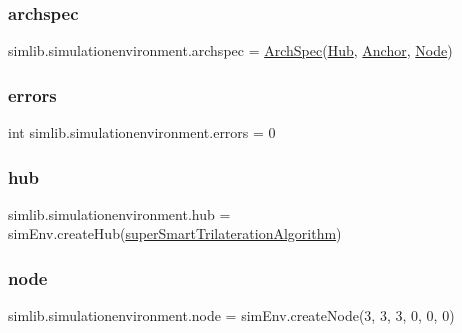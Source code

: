 \subsubsection{\texorpdfstring{archspec}{archspec}}
{\footnotesize\ttfamily simlib.\+simulationenvironment.\+archspec = \mbox{\hyperlink{classsimlib_1_1archspec_1_1_arch_spec}{Arch\+Spec}}(\mbox{\hyperlink{classsimlib_1_1hub_1_1_hub}{Hub}}, \mbox{\hyperlink{classsimlib_1_1anchor_1_1_anchor}{Anchor}}, \mbox{\hyperlink{classsimlib_1_1node_1_1_node}{Node}})}

\mbox{\label{namespacesimlib_1_1simulationenvironment_afca3d89fb0a9c3b8441731937fdb718b}} 
\subsubsection{\texorpdfstring{errors}{errors}}
{\footnotesize\ttfamily int simlib.\+simulationenvironment.\+errors = 0}

\mbox{\label{namespacesimlib_1_1simulationenvironment_af2a82533143b12ae401b918e0ae2df42}} 
\subsubsection{\texorpdfstring{hub}{hub}}
{\footnotesize\ttfamily simlib.\+simulationenvironment.\+hub = sim\+Env.\+create\+Hub(\mbox{\hyperlink{namespacesimlib_1_1simulationenvironment_a8566de74a9664d786456c8f421bae003}{super\+Smart\+Trilateration\+Algorithm}})}

\mbox{\label{namespacesimlib_1_1simulationenvironment_a49e74569249d8a4b630c5aeabe9219b3}} 
\subsubsection{\texorpdfstring{node}{node}}
{\footnotesize\ttfamily simlib.\+simulationenvironment.\+node = sim\+Env.\+create\+Node(3, 3, 3, 0, 0, 0)}

